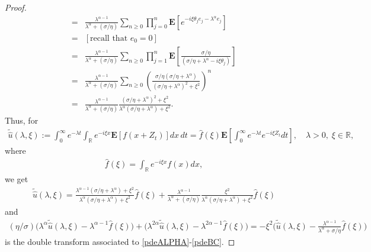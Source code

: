 \documentclass[10pt,a4paper]{article}
\numberwithin{equation}{section}
\theoremstyle{plain}
\theoremstyle{remark}
\begin{document}
\begin{proof}
\begin{align*}
= &  \frac{\lambda^{\alpha-1}}{\lambda^\alpha + (\sigma/\eta)} \sum_{n \geq 0} \prod_{j=0}^n \mathbf{E} \left[ e^{-i \xi \theta_j e_j - \lambda^\alpha e_j}   \right]\\
= & \left[ \textrm{recall that $e_0=0$} \right]\\
= &  \frac{\lambda^{\alpha-1}}{\lambda^\alpha + (\sigma/\eta)} \sum_{n \geq 0} \prod_{j=1}^n \mathbf{E} \left[ \frac{\sigma/\eta}{(\sigma/\eta + \lambda^\alpha - i \xi \theta_j)}   \right]\\
= & \frac{\lambda^{\alpha-1}}{\lambda^\alpha + (\sigma/\eta)} \sum_{n \geq 0} \left( \frac{\sigma/\eta (\sigma/\eta + \lambda^\alpha)}{(\sigma/\eta + \lambda^\alpha)^2 + \xi^2 }\right)^n \\
= & \frac{\lambda^{\alpha-1}}{\lambda^\alpha + (\sigma/\eta)} \frac{(\sigma/\eta + \lambda^\alpha)^2 + \xi^2}{\lambda^\alpha (\sigma/\eta + \lambda^\alpha) + \xi^2}.
\end{align*}
Thus, for 
\begin{align*}
\tilde{\hat{u}}(\lambda, \xi) := \int_0^\infty e^{-\lambda t} \int_{\mathbb{R}} e^{-i\xi x} \mathbf{E}[f(x + Z_t)] dx\, dt = \hat{f}(\xi) \mathbf{E} \left[ \int_0^\infty e^{-\lambda t} e^{-i\xi Z_t} dt \right], \quad \lambda>0,\; \xi \in \mathbb{R},
\end{align*}
where
\begin{align*}
\hat{f}(\xi) = \int_\mathbb{R} e^{-i \xi x} f(x) dx,
\end{align*}
we get
\begin{align*}
\tilde{\hat{u}}(\lambda, \xi) =  \frac{\lambda^{\alpha - 1}(\sigma/\eta + \lambda^\alpha) + \xi^2}{\lambda^\alpha (\sigma/\eta + \lambda^\alpha) + \xi^2} \hat{f}(\xi)  + \frac{\lambda^{\alpha-1}}{\lambda^\alpha + (\sigma/\eta)} \frac{\xi^2}{\lambda^\alpha (\sigma/\eta + \lambda^\alpha) + \xi^2} \hat{f}(\xi)
\end{align*}
and
\begin{align*}
(\eta/\sigma) \big( \lambda^\alpha \tilde{\hat{u}}(\lambda, \xi)  - \lambda^{\alpha-1}\hat{f}(\xi) \big) + \big(\lambda^{2\alpha} \tilde{\hat{u}}(\lambda, \xi)  - \lambda^{2\alpha -1} \hat{f}(\xi)\big) = - \xi^2 \bigg( \tilde{\hat{u}}(\lambda, \xi)  - \frac{\lambda^{\alpha-1}}{\lambda^\alpha + \sigma/\eta} \hat{f}(\xi) \bigg) 
\end{align*}
is the double transform associated to \eqref{pdeALPHA}-\eqref{pdeBC}.

\end{proof}
\end{document}
